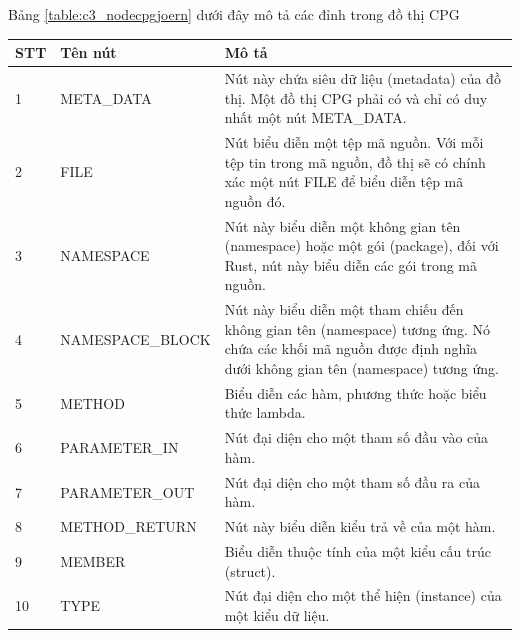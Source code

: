 Bảng \ref{table:c3_nodecpgjoern} dưới đây mô tả các đỉnh trong đồ thị CPG

\footnotesize
\begin{longtable}{| p{} | p{} | p{} |}
\hline
\textbf{STT} & \textbf{Tên nút} & \textbf{Mô tả} \\ \hline
1   & META\_DATA         & Nút này chứa siêu dữ liệu (metadata) của đồ thị. Một đồ thị CPG phải có và chỉ có duy nhất một nút META\_DATA.                                                   \\ \hline
2   & FILE              & Nút biểu diễn một tệp mã nguồn. Với mỗi tệp tin trong mã nguồn, đồ thị sẽ có chính xác một nút FILE để biểu diễn tệp mã nguồn đó.                               \\ \hline
3   & NAMESPACE         & Nút này biểu diễn một không gian tên (namespace) hoặc một gói (package), đối với Rust, nút này biểu diễn các gói trong mã nguồn.                                  \\ \hline
4   & NAMESPACE\_BLOCK   & Nút này biểu diễn một tham chiếu đến không gian tên (namespace) tương ứng. Nó chứa các khối mã nguồn được định nghĩa dưới không gian tên (namespace) tương ứng. \\ \hline
5   & METHOD            & Biểu diễn các hàm, phương thức hoặc biểu thức lambda.                                                                                                           \\ \hline
6   & PARAMETER\_IN      & Nút đại diện cho một tham số đầu vào của hàm.                                                                                                                   \\ \hline
7   & PARAMETER\_OUT     & Nút đại diện cho một tham số đầu ra của hàm.                                                                                                                    \\ \hline
8   & METHOD\_RETURN     & Nút này biểu diễn kiểu trả về của một hàm.                                                                                                                      \\ \hline
9   & MEMBER            & Biểu diễn thuộc tính của một kiểu cấu trúc (struct).                                                                                                            \\ \hline
10  & TYPE              & Nút đại diện cho một thể hiện (instance) của một kiểu dữ liệu.                                                                                                  \\ \hline

\end{longtable}
